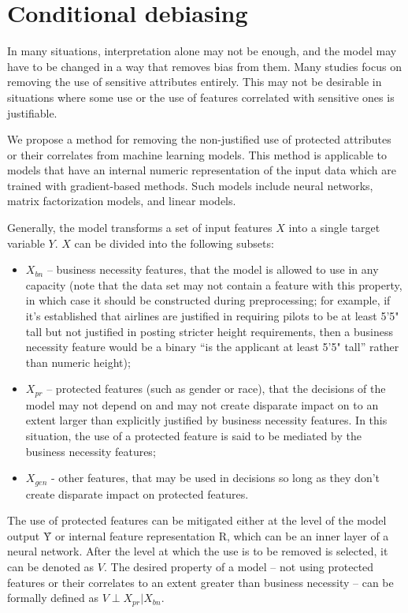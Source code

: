\section{Conditional debiasing}

In many situations, interpretation alone may not be enough, and the model may
have to be changed in a way that removes bias from them. Many studies focus on
removing the use of sensitive attributes entirely\cite{Beutel2017DataDA, TschantzDW12}.
This may not be desirable in situations where
some use or the use of features correlated with sensitive ones is justifiable.

We propose a method for removing the non-justified use of protected attributes or
their correlates from machine learning models. This method is applicable to models that have an
internal numeric representation of the input data which are trained with
gradient-based methods. Such models include neural networks, matrix
factorization models, and linear models.

Generally, the model transforms a set of input features $X$ into a single target
variable $Y$. $X$ can be divided into the following subsets:

\begin{itemize}
	\item
		$X_{bn}$ -- business necessity features, that the model is
		allowed to use in any capacity (note that the data set may not
		contain a feature with this property, in which case it should be
		constructed during preprocessing; for example, if it’s
		established that airlines are justified in requiring pilots to
		be at least 5'5" tall but not justified in posting stricter
		height requirements, then a business necessity feature would be
		a binary ``is the applicant at least 5'5" tall'' rather than
		numeric height);
	\item
		$X_{pr}$ -- protected features (such as gender or race), that
		the decisions of the model may not depend on and may not create
		disparate impact on to an extent larger than explicitly 
		justified by business necessity features. In this situation, the
		use of a protected feature is said to be mediated by the
		business necessity features;
	\item
		$X_{gen}$ - other features, that may be used in decisions so
		long as they don’t create disparate impact on protected features.
\end{itemize}

The use of protected features can be mitigated either at the level of the model
output $Ŷ$ or internal feature representation R, which can be an inner layer of a
neural network. After the level at which the use is to be removed is selected,
it can be denoted as $V$. The desired property of a model -- not using protected
features or their correlates to an extent greater than business necessity -- can
be formally defined as $V\perp X_{pr}|X_{bn}$.

